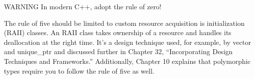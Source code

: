 \begin{myWarning}{WARNING}
In modern C++, adopt the rule of zero!
\end{myWarning}

The rule of five should be limited to custom resource acquisition is initialization (RAII) classes. An RAII class takes ownership of a resource and handles its deallocation at the right time. It’s a design technique used, for example, by vector and unique\_ptr and discussed further in Chapter 32, “Incorporating Design Techniques and Frameworks.” Additionally, Chapter 10 explains that polymorphic types require you to follow the rule of five as well.









